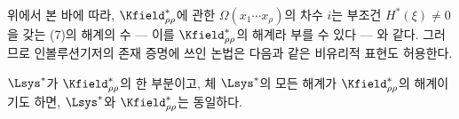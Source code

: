 
위에서 본 바에 따라, $\Kfield^*_{\rho\rho}$에 관한 $\Omega(x_1\cdots x_\rho)$의 차수 $i$는 부조건 $H^*(\xi)\ne0$을 갖는 (7)의 해계의 수 --- 이를 $\Kfield^*_{\rho\rho}$의 해계라 부를 수 있다 --- 와 같다. 그러므로 인볼루션기저의 존재 증명에 쓰인 논법은 다음과 같은 비유리적 표현도 허용한다.

\glqq{}$\Lsys^*$가 $\Kfield^*_{\rho\rho}$의 한 부분이고, 체 $\Lsys^*$의 모든 해계가 $\Kfield^*_{\rho\rho}$의 해계이기도 하면, $\Lsys^*$와 $\Kfield^*_{\rho\rho}$는 동일하다.\grqq{}
